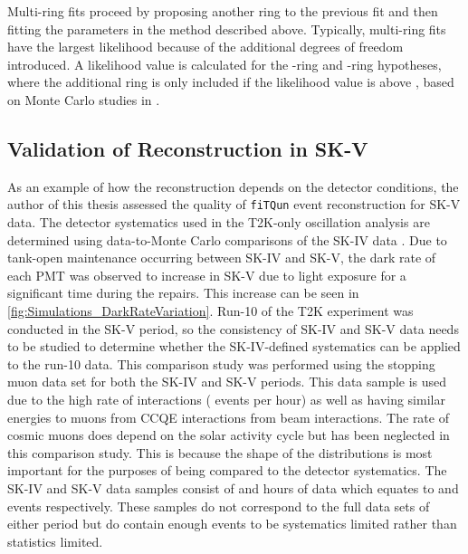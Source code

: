 
Multi-ring fits proceed by proposing another ring to the previous fit and then fitting the parameters in the method described above. Typically, multi-ring fits have the largest likelihood because of the additional degrees of freedom introduced. A likelihood value is calculated for the -ring and -ring hypotheses, where the additional ring is only included if the likelihood value is above , based on Monte Carlo studies in \cite{Tobayama:2016dsi}.

\subsection{Validation of Reconstruction in SK-V}
\label{sec:Simulation_ReconstructionInSKV}


As an example of how the reconstruction depends on the detector conditions, the author of this thesis assessed the quality of \texttt{fiTQun} event reconstruction for SK-V data. The detector systematics used in the T2K-only oscillation analysis are determined using data-to-Monte Carlo comparisons of the SK-IV data \cite{t2k_tn_399}. Due to tank-open maintenance occurring between SK-IV and SK-V, the dark rate of each PMT was observed to increase in SK-V due to light exposure for a significant time during the repairs. This increase can be seen in \autoref{fig:Simulations_DarkRateVariation}. Run-10 of the T2K experiment was conducted in the SK-V period, so the consistency of SK-IV and SK-V data needs to be studied to determine whether the SK-IV-defined systematics can be applied to the run-10 data. This comparison study was performed using the stopping muon data set for both the SK-IV and SK-V periods. This data sample is used due to the high rate of interactions ( events per hour) as well as having similar energies to muons from CCQE \quickmath{\nu_{\mu}} interactions from beam interactions. The rate of cosmic muons does depend on the solar activity cycle \cite{Maghrabi2021} but has been neglected in this comparison study. This is because the shape of the distributions is most important for the purposes of being compared to the detector systematics. The SK-IV and SK-V data samples consist of  and  hours of data which equates to  and  events respectively. These samples do not correspond to the full data sets of either period but do contain enough events to be systematics limited rather than statistics limited.

